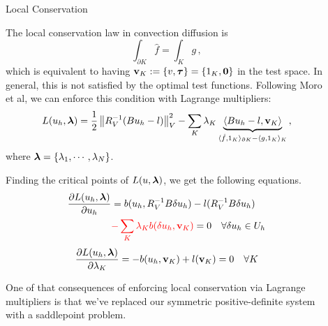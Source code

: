 \documentclass[final]{beamer}
\newlength{\sepwid}
\newlength{\onecolwid}
\begin{document}
\begin{frame}[t]
\begin{columns}[t]
\begin{column}{\onecolwid}
\begin{block}{Local Conservation}

The local conservation law in convection diffusion is
\[
\int_{\partial K}\hat f=\int_K g\,,
\]
which is equivalent to having $\mathbf{v}_K:=\{v,\boldsymbol\tau\}=\{1_K,\boldsymbol0\}$ in the test space.
In general, this is not satisfied by the optimal test functions.
Following Moro et al\cite{MoroNguyenPeraire11}, we
can enforce this condition with Lagrange multipliers:
\begin{align*}
L(u_h,\boldsymbol\lambda) = \frac{1}{2}\left\| R_V^{-1}(Bu_h-l) \right\|_V^2
-\sum_K\lambda_K\underbrace{\langle Bu_h-l,\mathbf{v}_K\rangle}_
{\langle\hat f, 1_K\rangle_{\partial K}-\langle g,1_K\rangle_K}\,,
\end{align*}
where $\boldsymbol\lambda=\{\lambda_1,\cdots,\lambda_N\}$.

Finding the critical points of $L(u,\boldsymbol\lambda)$, we get the following
equations.
\begin{align*}
\frac{\partial L(u_h,\boldsymbol\lambda)}{\partial u_h}&=b(u_h,R_V^{-1}B\delta u_h)
-l(R_V^{-1}B\delta u_h)\\
&{\color{red}-\sum_K\lambda_K b(\delta
u_h,\mathbf{v}_K)}=0\quad\forall\delta u_h\in U_h
\end{align*}
\[
\frac{\partial
L(u_h,\boldsymbol\lambda)}{\partial\lambda_K}=-b(u_h,\mathbf{v}_K)+l(\mathbf{v}_K)=0\quad\forall
K
\]

One of that consequences of enforcing local conservation via Lagrange multipliers
is that we've replaced our symmetric positive-definite system with a
saddlepoint problem.


\end{block}


\end{column} %

\begin{column}{\sepwid}\end{column} %

\begin{column}{\onecolwid} %


\end{column}
\end{columns}
\end{frame}
\end{document}

